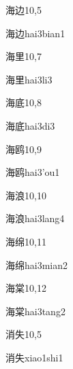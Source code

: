 \begin{entry}{海边}{10,5}
  \begin{phonetics}{海边}{hai3bian1}
  \end{phonetics}
\end{entry}

\begin{entry}{海里}{10,7}
  \begin{phonetics}{海里}{hai3li3}
  \end{phonetics}
\end{entry}

\begin{entry}{海底}{10,8}
  \begin{phonetics}{海底}{hai3di3}
  \end{phonetics}
\end{entry}

\begin{entry}{海鸥}{10,9}
  \begin{phonetics}{海鸥}{hai3'ou1}
  \end{phonetics}
\end{entry}

\begin{entry}{海浪}{10,10}
  \begin{phonetics}{海浪}{hai3lang4}
  \end{phonetics}
\end{entry}

\begin{entry}{海绵}{10,11}
  \begin{phonetics}{海绵}{hai3mian2}
  \end{phonetics}
\end{entry}

\begin{entry}{海棠}{10,12}
  \begin{phonetics}{海棠}{hai3tang2}
  \end{phonetics}
\end{entry}

\begin{entry}{消失}{10,5}
  \begin{phonetics}{消失}{xiao1shi1}
  \end{phonetics}
\end{entry}

